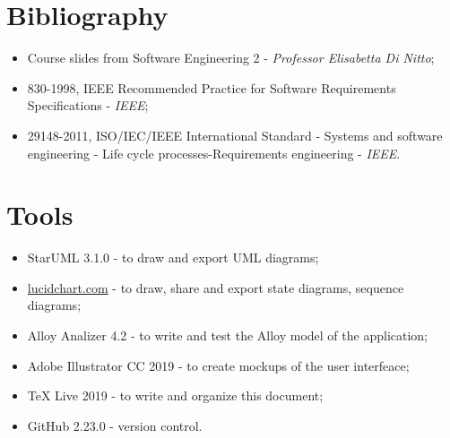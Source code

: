 \documentclass[12pt,a4paper]{report}
\begin{document}
	\section{Bibliography}
	\begin{itemize}
	\item Course slides from Software Engineering 2 - \emph{Professor Elisabetta Di Nitto};
	\item 830-1998, IEEE Recommended Practice for Software Requirements Specifications - \emph{IEEE};
	\item 29148-2011, ISO/IEC/IEEE International Standard - Systems and software engineering - Life cycle processes-Requirements engineering - \emph{IEEE}.
	\end{itemize}

	\section{Tools}
	\begin{itemize}
	\item StarUML 3.1.0 - to draw and export UML diagrams;
	\item \url{lucidchart.com} - to draw, share and export state diagrams, sequence diagrams;
	\item Alloy Analizer 4.2 - to write and test the Alloy model of the application;
	\item Adobe Illustrator CC 2019 - to create mockups of the user interfeace;
	\item TeX Live 2019 - to write and organize this document;
	\item GitHub 2.23.0 - version control.
	\end{itemize}

\end{document}
